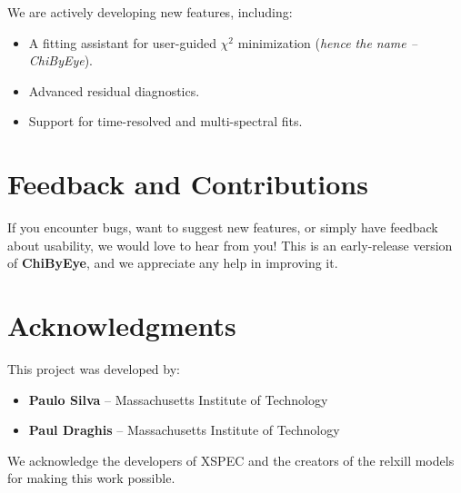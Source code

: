 \documentclass[11pt]{article}
\begin{document}
We are actively developing new features, including:
\begin{itemize}
    \item A fitting assistant for user-guided $\chi^2$ minimization (\textit{hence the name -- ChiByEye}).
    \item Advanced residual diagnostics.
    \item Support for time-resolved and multi-spectral fits.
\end{itemize}

\section*{Feedback and Contributions}

If you encounter bugs, want to suggest new features, or simply have feedback about usability, we would love to hear from you!  
This is an early-release version of \textbf{ChiByEye}, and we appreciate any help in improving it.

\section*{Acknowledgments}

This project was developed by:

\begin{itemize}
    \item \textbf{Paulo Silva} – Massachusetts Institute of Technology
    \item \textbf{Paul Draghis} – Massachusetts Institute of Technology
\end{itemize}

\bigskip

\noindent We acknowledge the developers of XSPEC and the creators of the relxill models for making this work possible.
\end{document}
